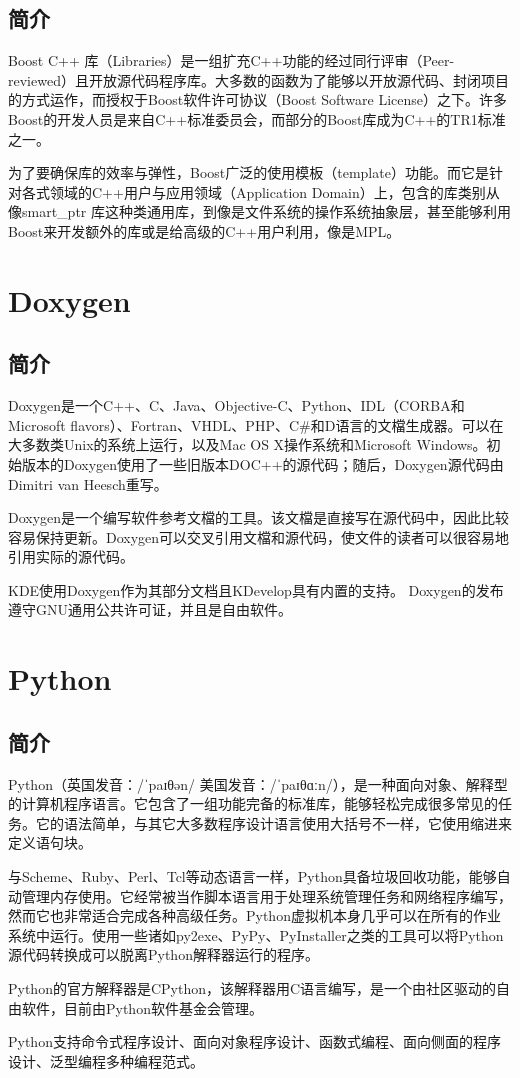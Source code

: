 	\subsection{简介}
	\par Boost C++ 库（Libraries）是一组扩充C++功能的经过同行评审（Peer-reviewed）且开放源代码程序库。大多数的函数为了能够以开放源代码、封闭项目的方式运作，而授权于Boost软件许可协议（Boost Software License）之下。许多Boost的开发人员是来自C++标准委员会，而部分的Boost库成为C++的TR1标准之一。
	\par 为了要确保库的效率与弹性，Boost广泛的使用模板（template）功能。而它是针对各式领域的C++用户与应用领域（Application Domain）上，包含的库类别从像smart\_ptr 库这种类通用库，到像是文件系统的操作系统抽象层，甚至能够利用Boost来开发额外的库或是给高级的C++用户利用，像是MPL。\cite{ wiki:Boost}
\section{Doxygen}
	\subsection{简介}
	\par Doxygen是一个C++、C、Java、Objective-C、Python、IDL（CORBA和Microsoft flavors）、Fortran、VHDL、PHP、C\#和D语言的文檔生成器。可以在大多数类Unix的系统上运行，以及Mac OS X操作系统和Microsoft Windows。初始版本的Doxygen使用了一些旧版本DOC++的源代码；随后，Doxygen源代码由Dimitri van Heesch重写。
	\par Doxygen是一个编写软件参考文檔的工具。该文檔是直接写在源代码中，因此比较容易保持更新。Doxygen可以交叉引用文檔和源代码，使文件的读者可以很容易地引用实际的源代码。
	\par KDE使用Doxygen作为其部分文档且KDevelop具有内置的支持。 Doxygen的发布遵守GNU通用公共许可证，并且是自由软件。\cite{ wiki:Doxygen}
\section{Python}
	\subsection{简介}
	\par Python（英国发音：/ˈpaɪθən/ 美国发音：/ˈpaɪθɑːn/），是一种面向对象、解释型的计算机程序语言。它包含了一组功能完备的标准库，能够轻松完成很多常见的任务。它的语法简单，与其它大多数程序设计语言使用大括号不一样，它使用缩进来定义语句块。
	\par 与Scheme、Ruby、Perl、Tcl等动态语言一样，Python具备垃圾回收功能，能够自动管理内存使用。它经常被当作脚本语言用于处理系统管理任务和网络程序编写，然而它也非常适合完成各种高级任务。Python虚拟机本身几乎可以在所有的作业系统中运行。使用一些诸如py2exe、PyPy、PyInstaller之类的工具可以将Python源代码转换成可以脱离Python解释器运行的程序。
	\par Python的官方解释器是CPython，该解释器用C语言编写，是一个由社区驱动的自由软件，目前由Python软件基金会管理。
	\par Python支持命令式程序设计、面向对象程序设计、函数式编程、面向侧面的程序设计、泛型编程多种编程范式。\cite{ wiki:Python}
